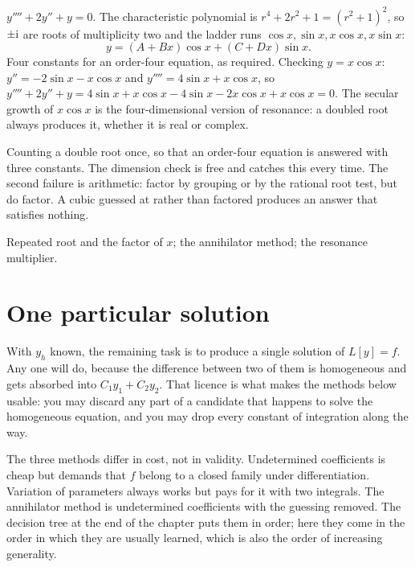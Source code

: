 \begin{worked}
$y''''+2y''+y=0$. The characteristic polynomial is $r^{4}+2r^{2}+1=(r^{2}+1)^{2}$, so $\pm\mathrm{i}$ are roots of multiplicity two and the ladder runs $\cos x,\sin x,x\cos x,x\sin x$:
\[y=(A+Bx)\cos x+(C+Dx)\sin x.\]
Four constants for an order-four equation, as required. Checking $y=x\cos x$: $y''=-2\sin x-x\cos x$ and $y''''=4\sin x+x\cos x$, so $y''''+2y''+y=4\sin x+x\cos x-4\sin x-2x\cos x+x\cos x=0$. The secular growth of $x\cos x$ is the four-dimensional version of resonance: a doubled root always produces it, whether it is real or complex.
\end{worked}

\begin{trap}
Counting a double root once, so that an order-four equation is answered with three constants. The dimension check is free and catches this every time. The second failure is arithmetic: factor by grouping or by the rational root test, but do factor. A cubic guessed at rather than factored produces an answer that satisfies nothing.
\end{trap}

\begin{seealsob}Repeated root and the factor of $x$; the annihilator method; the resonance multiplier.\end{seealsob}

\section{One particular solution}

With $y_h$ known, the remaining task is to produce a single solution of $L[y]=f$. Any one will do, because the difference between two of them is homogeneous and gets absorbed into $C_1y_1+C_2y_2$. That licence is what makes the methods below usable: you may discard any part of a candidate that happens to solve the homogeneous equation, and you may drop every constant of integration along the way.

The three methods differ in cost, not in validity. Undetermined coefficients is cheap but demands that $f$ belong to a closed family under differentiation. Variation of parameters always works but pays for it with two integrals. The annihilator method is undetermined coefficients with the guessing removed. The decision tree at the end of the chapter puts them in order; here they come in the order in which they are usually learned, which is also the order of increasing generality.

